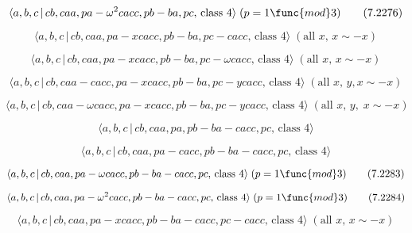 \documentclass[10pt]{article}
\begin{document}
\begin{equation}
\langle a,b,c\,|\,cb,caa,pa-\omega ^{2}cacc,pb-ba,pc,\,\text{class }4\rangle
\;(p=1\func{mod}3)  \tag{7.2276}
\end{equation}

\begin{equation}
\langle a,b,c\,|\,cb,caa,pa-xcacc,pb-ba,pc-cacc,\,\text{class }4\rangle \;(%
\text{all }x,\,x\sim -x)  \tag{7.2277}
\end{equation}

\begin{equation}
\langle a,b,c\,|\,cb,caa,pa-xcacc,pb-ba,pc-\omega cacc,\,\text{class }%
4\rangle \;(\text{all }x,\,x\sim -x)  \tag{7.2278}
\end{equation}

\begin{equation}
\langle a,b,c\,|\,cb,caa-cacc,pa-xcacc,pb-ba,pc-ycacc,\,\text{class }%
4\rangle \;(\text{all }x,\,y,x\sim -x)  \tag{7.2279}
\end{equation}

\begin{equation}
\langle a,b,c\,|\,cb,caa-\omega cacc,pa-xcacc,pb-ba,pc-ycacc,\,\text{class }%
4\rangle \;(\text{all }x,\,y,\;x\sim -x)  \tag{7.2280}
\end{equation}

\begin{equation}
\langle a,b,c\,|\,cb,caa,pa,pb-ba-cacc,pc,\,\text{class }4\rangle 
\tag{7.2281}
\end{equation}

\begin{equation}
\langle a,b,c\,|\,cb,caa,pa-cacc,pb-ba-cacc,pc,\,\text{class }4\rangle 
\tag{7.2282}
\end{equation}

\begin{equation}
\langle a,b,c\,|\,cb,caa,pa-\omega cacc,pb-ba-cacc,pc,\,\text{class }%
4\rangle \;(p=1\func{mod}3)  \tag{7.2283}
\end{equation}

\begin{equation}
\langle a,b,c\,|\,cb,caa,pa-\omega ^{2}cacc,pb-ba-cacc,pc,\,\text{class }%
4\rangle \;(p=1\func{mod}3)  \tag{7.2284}
\end{equation}

\begin{equation}
\langle a,b,c\,|\,cb,caa,pa-xcacc,pb-ba-cacc,pc-cacc,\,\text{class }4\rangle
\;(\text{all }x,\,x\sim -x)  \tag{7.2285}
\end{equation}
\end{document}

